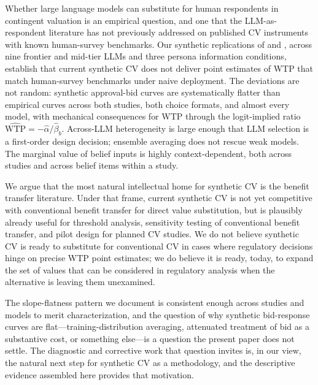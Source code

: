 \documentclass[12pt]{article}
\begin{document}
Whether large language models can substitute for human respondents in
contingent valuation is an empirical question, and one that the
LLM-as-respondent literature has not previously addressed on published
CV instruments with known human-survey benchmarks. Our synthetic
replications of \textcite{Aldy2012} and \textcite{Giguere2020}, across
nine frontier and mid-tier LLMs and three persona information conditions,
establish that current synthetic CV does not deliver point estimates of
WTP that match human-survey benchmarks under naive deployment. The
deviations are not random: synthetic approval-bid curves are
systematically flatter than empirical curves across both studies, both
choice formats, and almost every model, with mechanical consequences for
WTP through the logit-implied ratio
$\widehat{\text{WTP}} = -\hat{\alpha}/\hat{\beta}_b$. Across-LLM
heterogeneity is large enough that LLM selection is a first-order design
decision; ensemble averaging does not rescue weak models. The marginal
value of belief inputs is highly context-dependent, both across studies
and across belief items within a study.

We argue that the most natural intellectual home for synthetic CV is the
benefit transfer literature. Under that frame, current synthetic CV is
not yet competitive with conventional benefit transfer for direct value
substitution, but is plausibly already useful for threshold analysis,
sensitivity testing of conventional benefit transfer, and pilot design
for planned CV studies. We do not believe synthetic CV is ready to
substitute for conventional CV in cases where regulatory decisions hinge
on precise WTP point estimates; we do believe it is ready, today, to
expand the set of values that can be considered in regulatory analysis
when the alternative is leaving them unexamined.

The slope-flatness pattern we document is consistent enough across
studies and models to merit characterization, and the question of why
synthetic bid-response curves are flat---training-distribution
averaging, attenuated treatment of bid as a substantive cost, or
something else---is a question the present paper does not settle. The
diagnostic and corrective work that question invites is, in our view,
the natural next step for synthetic CV as a methodology, and
the descriptive evidence assembled here provides that motivation.

\newpage
\printbibliography
\end{document}
